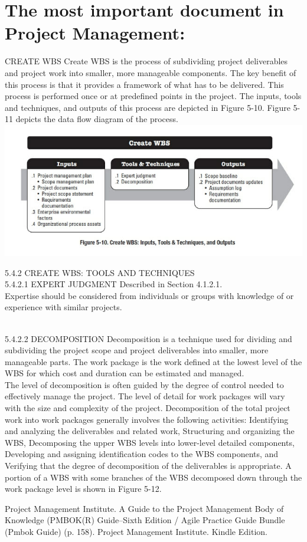 \section{The most important document in Project Management:}

CREATE WBS Create WBS is the process of subdividing project deliverables and project work into smaller, more manageable components. The key benefit of this process is that it provides a framework of what has to be delivered. This process is performed once or at predefined points in the project. The inputs, tools and techniques, and outputs of this process are depicted in Figure 5-10. Figure 5-11 depicts the data flow diagram of the process.\\

\includegraphics[]{createWBS.jpg}

5.4.2 CREATE WBS: TOOLS AND TECHNIQUES \\

5.4.2.1 EXPERT JUDGMENT Described in Section 4.1.2.1. \\

Expertise should be considered from individuals or groups with knowledge of or experience with similar projects. 

\\

5.4.2.2 DECOMPOSITION Decomposition is a technique used for dividing and subdividing the project scope and project deliverables into smaller, more manageable parts. The work package is the work defined at the lowest level of the WBS for which cost and duration can be estimated and managed. 
\\

The level of decomposition is often guided by the degree of control needed to effectively manage the project. The level of detail for work packages will vary with the size and complexity of the project. Decomposition of the total project work into work packages generally involves the following activities: Identifying and analyzing the deliverables and related work, Structuring and organizing the WBS, Decomposing the upper WBS levels into lower-level detailed components, Developing and assigning identification codes to the WBS components, and Verifying that the degree of decomposition of the deliverables is appropriate. A portion of a WBS with some branches of the WBS decomposed down through the work package level is shown in Figure 5-12. 
\newline



Project Management Institute. A Guide to the Project Management Body of Knowledge (PMBOK(R) Guide–Sixth Edition / Agile Practice Guide Bundle (Pmbok Guide) (p. 158). Project Management Institute. Kindle Edition. 